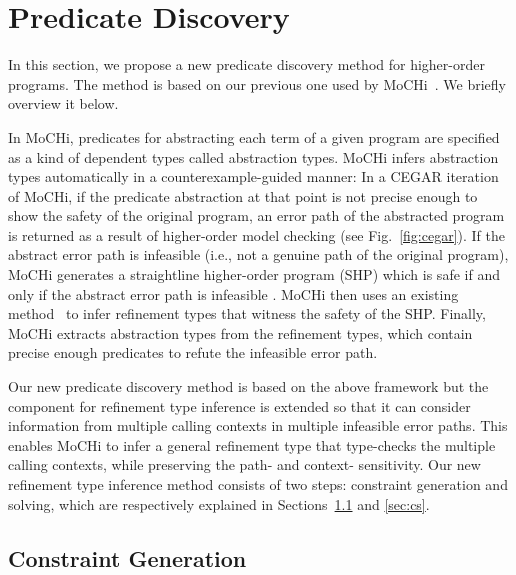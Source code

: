

\section{Predicate Discovery}

In this section, we propose a new predicate discovery method for 
higher-order programs.  The method is based on our previous one used by 
MoCHi~\cite{KobayashiPLDI2011}.  We briefly overview it below.

In MoCHi, predicates for abstracting each term of a given program are 
specified as a kind of dependent types called abstraction types.  MoCHi 
infers abstraction types automatically in a counterexample-guided manner: 
 In a CEGAR iteration of MoCHi, if the predicate abstraction at that 
point is not precise enough to show the safety of the original program, 
an error path of the abstracted program is returned as a result of 
higher-order model checking (see Fig.~\ref{fig:cegar}).  If the abstract 
error path is infeasible (i.e., not a genuine path of the original 
program), MoCHi generates a straightline higher-order program (SHP) 
which is safe if and only if the abstract error path is infeasible .  
MoCHi then uses an existing method~\cite{Unno2009} to infer refinement 
types that witness the safety of the SHP.  Finally, MoCHi extracts 
abstraction types from the refinement types, which contain precise 
enough predicates to refute the infeasible error path.

Our new predicate discovery method is based on the above framework but 
the component for refinement type inference is extended so that it can 
consider information from multiple calling contexts in multiple 
infeasible error paths.  This enables MoCHi to infer a general 
refinement type that type-checks the multiple calling contexts, while 
preserving the path- and context- sensitivity.  Our new refinement type 
inference method consists of two steps: constraint generation and 
solving, which are respectively explained in Sections~\ref{sec:cg} and 
\ref{sec:cs}.

\subsection{Constraint Generation}
\label{sec:cg}

